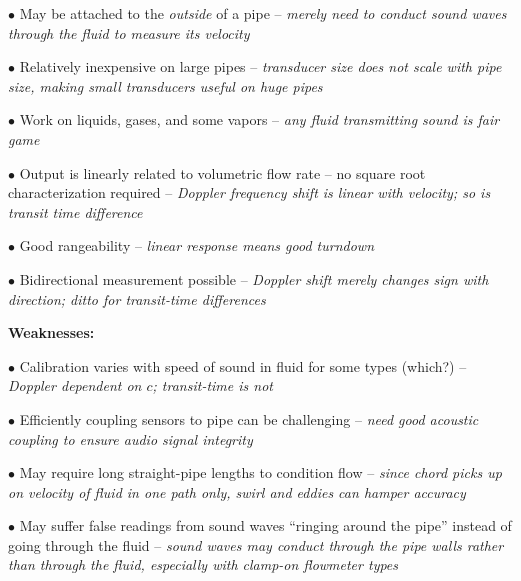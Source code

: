 \medskip
\item{$\bullet$} May be attached to the {\it outside} of a pipe -- {\it merely need to conduct sound waves through the fluid to measure its velocity}
\item{$\bullet$} Relatively inexpensive on large pipes -- {\it transducer size does not scale with pipe size, making small transducers useful on huge pipes}
\item{$\bullet$} Work on liquids, gases, and some vapors -- {\it any fluid transmitting sound is fair game}
\item{$\bullet$} Output is linearly related to volumetric flow rate -- no square root characterization required -- {\it Doppler frequency shift is linear with velocity; so is transit time difference}
\item{$\bullet$} Good rangeability -- {\it linear response means good turndown}
\item{$\bullet$} Bidirectional measurement possible -- {\it Doppler shift merely changes sign with direction; ditto for transit-time differences}
\medskip

\vskip 10pt

{\bf Weaknesses:}

\medskip
\item{$\bullet$} Calibration varies with speed of sound in fluid for some types (which?) -- {\it Doppler dependent on $c$; transit-time is not}
\item{$\bullet$} Efficiently coupling sensors to pipe can be challenging -- {\it need good acoustic coupling to ensure audio signal integrity}
\item{$\bullet$} May require long straight-pipe lengths to condition flow -- {\it since chord picks up on velocity of fluid in one path only, swirl and eddies can hamper accuracy}
\item{$\bullet$} May suffer false readings from sound waves ``ringing around the pipe'' instead of going through the fluid -- {\it sound waves may conduct through the pipe walls rather than through the fluid, especially with clamp-on flowmeter types}
\medskip





